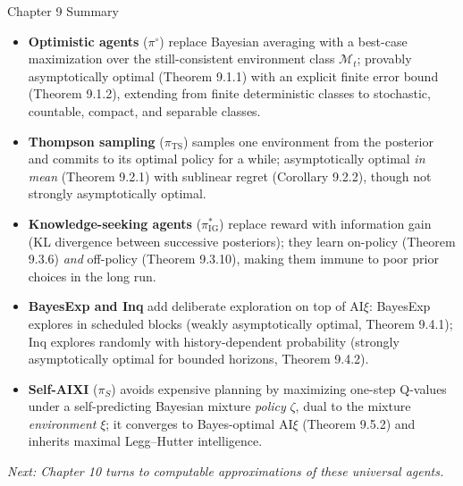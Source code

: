 \documentclass[aspectratio=169,10pt]{beamer}
\newcommand{\IG}{\mathrm{IG}}
\begin{document}
\begin{frame}{Chapter 9 Summary}
  \begin{itemize}
    \item \textbf{Optimistic agents} ($\pi^\circ$) replace Bayesian
      averaging with a best-case maximization over the still-consistent
      environment class $\mathcal{M}_t$; provably asymptotically optimal
      (Theorem 9.1.1) with an explicit finite error bound (Theorem 9.1.2),
      extending from finite deterministic classes to stochastic, countable,
      compact, and separable classes.
    \item \textbf{Thompson sampling} ($\pi_{\mathrm{TS}}$) samples one
      environment from the posterior and commits to its optimal policy for
      a while; asymptotically optimal \emph{in mean} (Theorem 9.2.1) with
      sublinear regret (Corollary 9.2.2), though not strongly
      asymptotically optimal.
    \item \textbf{Knowledge-seeking agents} ($\pi^*_{\IG}$) replace reward
      with information gain (KL divergence between successive posteriors);
      they learn on-policy (Theorem 9.3.6) \emph{and} off-policy (Theorem
      9.3.10), making them immune to poor prior choices in the long run.
    \item \textbf{BayesExp and Inq} add deliberate exploration on top of
      $\mathrm{AI}\xi$: BayesExp explores in scheduled blocks (weakly
      asymptotically optimal, Theorem 9.4.1); Inq explores randomly with
      history-dependent probability (strongly asymptotically optimal for
      bounded horizons, Theorem 9.4.2).
    \item \textbf{Self-AIXI} ($\pi_S$) avoids expensive planning by
      maximizing one-step Q-values under a self-predicting Bayesian mixture
      \emph{policy} $\zeta$, dual to the mixture \emph{environment} $\xi$;
      it converges to Bayes-optimal $\mathrm{AI}\xi$ (Theorem 9.5.2) and
      inherits maximal Legg--Hutter intelligence.
  \end{itemize}
  \vspace{0.3em}
  \centering\emph{Next: Chapter 10 turns to computable approximations of these universal agents.}
\end{frame}
\end{document}
